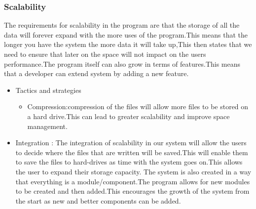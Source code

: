 
%

\subsubsection{Scalability}
\begin{flushleft}
The requirements for scalability in the program are that the storage of all the data will forever expand with the more uses of the program.This means that the longer you have the system the more data it will take up,This then states that we need to ensure that later on the space will not impact on the users performance.The program itself can also grow in terms of features.This means that a developer can extend system by adding a new feature.
\begin{itemize}
\item{Tactics and strategies}
\begin{itemize}
\item{Compression}:compression of the files will allow more files to be stored on a hard drive.This can lead to greater scalability and improve space management.
\end{itemize}

\item{Integration} :
The integration of scalability in our system will allow the users to decide where the files that are written will be saved.This will enable them to save the files to hard-drives as time with the system goes on.This allows the user to expand their storage capacity.
The system is also created in a way that everything is a module/component.The program allows for new modules to be created and then added.This encourages the growth of the system from the start as new and better components can be added.
\end{itemize}

\end{flushleft}
		
